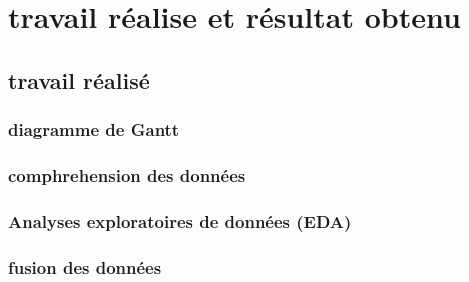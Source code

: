 \section{travail réalise et résultat obtenu} 
\subsection{travail réalisé}
\subsubsection{diagramme de Gantt} 
\subsubsection{comphrehension des données}  
\subsubsection{Analyses exploratoires de données (EDA)}
\subsubsection{fusion des données}

